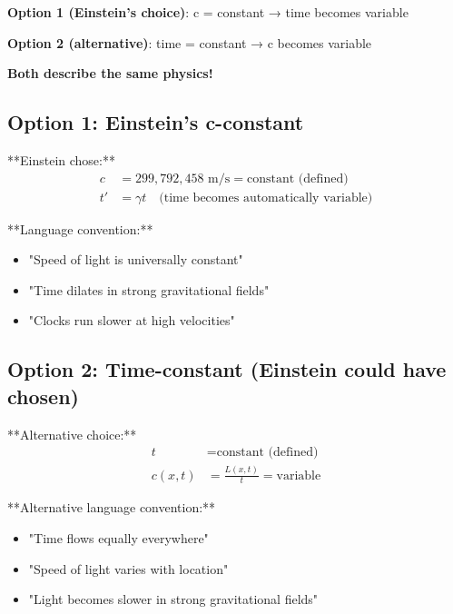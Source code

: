 \documentclass[12pt,a4paper]{article}
\begin{document}
{{{{{\begin{tcolorbox}[colback=orange!5!white,colframe=orange!75!black,title=The Fundamental Choice Option]
							\textbf{Option 1 (Einstein's choice)}: c = constant → time becomes variable
							
							\textbf{Option 2 (alternative)}: time = constant → c becomes variable
							
							\textbf{Both describe the same physics!}
						\end{tcolorbox}
						
						\subsection{Option 1: Einstein's c-constant}
						
						**Einstein chose:**
						\begin{align}
							c &= 299,792,458 \text{ m/s} = \text{constant (defined)} \\
							t' &= \gamma t \quad \text{(time becomes automatically variable)}
						\end{align}
						
						**Language convention:**
						\begin{itemize}
							\item "Speed of light is universally constant"
							\item "Time dilates in strong gravitational fields"
							\item "Clocks run slower at high velocities"
						\end{itemize}
						
						\subsection{Option 2: Time-constant (Einstein could have chosen)}
						
						**Alternative choice:**
						\begin{align}
							t &= \text{constant (defined)} \\
							c(x,t) &= \frac{L(x,t)}{t} = \text{variable}
						\end{align}
						
						**Alternative language convention:**
						\begin{itemize}
							\item "Time flows equally everywhere"
							\item "Speed of light varies with location"
							\item "Light becomes slower in strong gravitational fields"
						\end{itemize}
						
}}}}}
\end{document}
